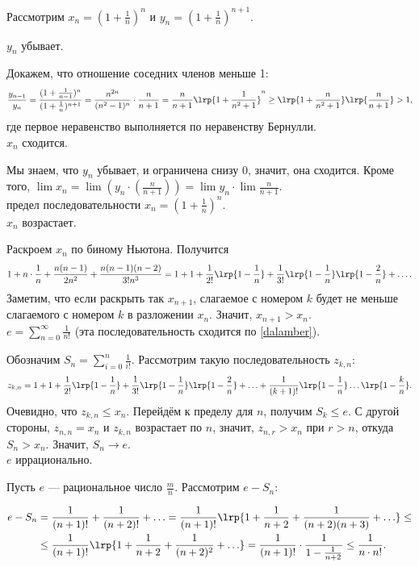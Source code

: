 \documentclass[12pt,a4paper]{article}
\begin{document}
Рассмотрим $x_n=(1+\frac{1}{n})^n$ и $y_n=(1+\frac{1}{n})^{n+1}$.

\lemma $y_n$ убывает.

\proof Докажем, что отношение соседних членов меньше 1: \[
\frac{y_{n-1}}{y_n}=\frac{(1+\frac{1}{n-1})^n}{(1+\frac{1}{n})^{n+1}}=\frac{n^{2n}}{(n^2-1)^n}\cdot \frac{n}{n+1}=\frac{n}{n+1}\lrp{1+\frac{1}{n^2+1}}^n\geq \lrp{1+\frac{n}{n^2+1}}\lrp{\frac{n}{n+1}}>1,
\] где первое неравенство выполняется по неравенству Бернулли.\QEDA\\

\lemma $x_n$ сходится.

\proof Мы знаем, что $y_n$ убывает, и ограничена снизу 0, значит, она сходится. Кроме того, $\lim x_n=\lim (y_n\cdot (\frac{n}{n+1}))=\lim y_n\cdot \lim \frac{n}{n+1}$.\QEDA\\

 предел последовательности $x_n=(1+\frac{1}{n})^n$.\\

\lemma $x_n$ возрастает.

\proof Раскроем $x_n$ по биному Ньютона. Получится \[
1+n\cdot \frac{1}{n}+\frac{n(n-1)}{2n^2}+\frac{n(n-1)(n-2)}{3!n^3}=1+1+\frac{1}{2!}\lrp{1-\frac{1}{n}}+\frac{1}{3!}\lrp{1-\frac{1}{n}}\lrp{1-\frac{2}{n}}+\ldots.
\] Заметим, что если раскрыть так $x_{n+1}$, слагаемое с номером $k$ будет не меньше слагаемого с номером $k$ в разложении $x_n$. Значит, $x_{n+1}>x_n$.\QEDA\\

\lemma $e=\sum_{n=0}^\infty \frac{1}{n!}$ (эта последовательность сходится по \ref{dalamber}).

\proof Обозначим $S_n=\sum_{i=0}^n \frac{1}{i!}$. Рассмотрим такую последовательность $z_{k,n}$: \[
	z_{k,n}=1+1+\frac{1}{2!}\lrp{1-\frac{1}{n}}	+\frac{1}{3!}\lrp{1-\frac{1}{n}}\lrp{1-\frac{2}{n}}+\ldots +\frac{1}{(k+1)!}\lrp{1-\frac{1}{n}} \ldots \lrp{1-\frac{k}{n}}.  
\] Очевидно, что $z_{k,n}\leq x_n$. Перейдём к пределу для $n$, получим $S_k\leq e$. С другой стороны, $z_{n,n}=x_n$ и $z_{k,n}$ возрастает по $n$, значит, $z_{n,r}>x_n$ при $r>n$, откуда $S_n>x_n$. Значит, $S_n\to e$.\QEDA\\

\theorem $e$ иррационально.

\proof Пусть $e$ --- рациональное число $\frac{m}{n}$. Рассмотрим $e-S_n$: 

\begin{align*}
	e-S_n&=\frac{1}{(n+1)!}+\frac{1}{(n+2)!}+\ldots =\frac{1}{(n+1)!}\lrp{1+\frac{1}{n+2}+\frac{1}{(n+2)(n+3)}+\ldots } \leq\\
		 &\leq \frac{1}{(n+1)!}\lrp{1+\frac{1}{n+2}+\frac{1}{(n+2)^2}+\ldots}=\frac{1}{(n+1)!}\cdot \frac{1}{1-\frac1{n+2}}\leq \frac1{n\cdot n!}.
\end{align*}
\end{document}
